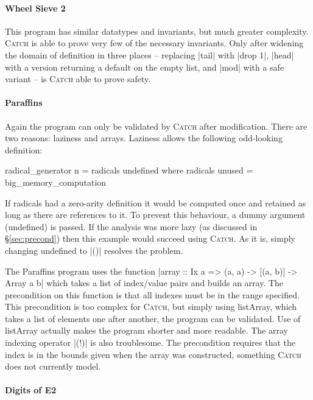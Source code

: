 \documentclass[preprint]{sigplanconf}
\newcommand{\C}[1]{\textsf{#1}}
\newcommand{\catch}{\textsc{Catch}}
\begin{document}
\paragraph{Wheel Sieve 2}

This program has similar datatypes and invariants, but much greater complexity. \catch{} is able to prove very few of the necessary invariants. Only after widening the domain of definition in three places -- replacing |tail| with |drop 1|, |head| with a version returning a default on the empty list, and |mod| with a safe variant -- is \catch{} able to prove safety.


\paragraph{Paraffins}

Again the program can only be validated by \catch{} after modification. There are two reasons: laziness and arrays. Laziness allows the following odd-looking definition:

\begin{code}
radical_generator n = radicals undefined
  where radicals unused = big_memory_computation
\end{code}

If \C{radicals} had a zero-arity definition it would be computed once and retained as long as there are references to it. To prevent this behaviour, a dummy argument (\C{undefined}) is passed. If the analysis was more lazy (as discussed in \S\ref{sec:precond}) then this example would succeed using \catch{}. As it is, simply changing \C{undefined} to |()| resolves the problem.

The Paraffins program uses the function |array :: Ix a => (a, a) -> [(a, b)] -> Array a b| which takes a list of index/value pairs and builds an array. The precondition on this function is that all indexes must be in the range specified. This precondition is too complex for \catch{}, but simply using \C{listArray}, which takes a list of elements one after another, the program can be validated. Use of \C{listArray} actually makes the program shorter and more readable. The array indexing operator |(!)| is also troublesome. The precondition requires that the index is in the bounds given when the array was constructed, something \catch{} does not currently model.


\paragraph{Digits of E2}
\end{document}
